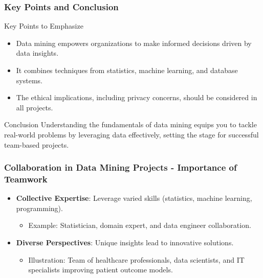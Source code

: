 \documentclass[aspectratio=169]{beamer}
\begin{document}
\begin{frame}[fragile]
    \frametitle{Key Points and Conclusion}
    \begin{block}{Key Points to Emphasize}
        \begin{itemize}
            \item Data mining empowers organizations to make informed decisions driven by data insights.
            \item It combines techniques from statistics, machine learning, and database systems.
            \item The ethical implications, including privacy concerns, should be considered in all projects.
        \end{itemize}
    \end{block}

    \begin{block}{Conclusion}
        Understanding the fundamentals of data mining equips you to tackle real-world problems by leveraging data effectively, setting the stage for successful team-based projects.
    \end{block}
\end{frame}

\begin{frame}[fragile]
    \frametitle{Collaboration in Data Mining Projects - Importance of Teamwork}
    \begin{itemize}
        \item \textbf{Collective Expertise}: Leverage varied skills (statistics, machine learning, programming).
        \begin{itemize}
            \item Example: Statistician, domain expert, and data engineer collaboration.
        \end{itemize}
        \item \textbf{Diverse Perspectives}: Unique insights lead to innovative solutions.
        \begin{itemize}
            \item Illustration: Team of healthcare professionals, data scientists, and IT specialists improving patient outcome models.
        \end{itemize}
    \end{itemize}
\end{frame}
\end{document}
